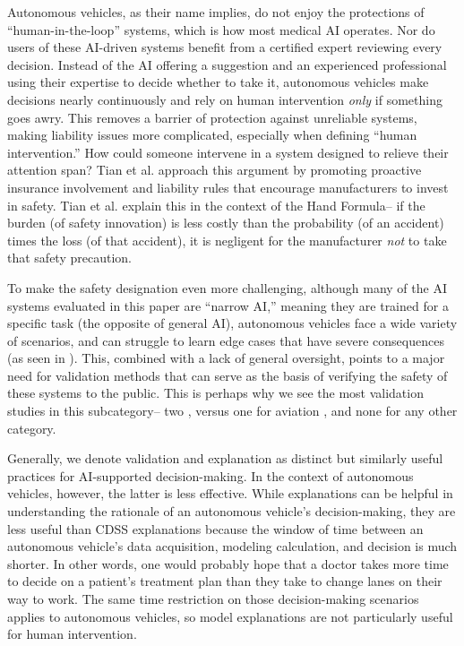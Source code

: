 \documentclass[authoryear,preprint,12pt]{elsarticle}
\begin{document}
Autonomous vehicles, as their name implies, do not enjoy the protections of
``human-in-the-loop'' systems, which is how most medical AI operates. Nor do
users of these AI-driven systems benefit from a certified expert reviewing every
decision. Instead of the AI offering a suggestion and an experienced
professional using their expertise to decide whether to take it, autonomous
vehicles make decisions nearly continuously and rely on human intervention
\textit{only} if something goes awry. This removes a barrier of protection
against unreliable systems, making liability issues more complicated, especially
when defining ``human intervention.'' How could someone intervene in a system
designed to relieve their attention span? Tian et al.
\cite{tianHowShouldAutonomous2025} approach this argument by promoting proactive
insurance involvement and liability rules that encourage manufacturers to invest
in safety. Tian et al. \cite{tianHowShouldAutonomous2025} explain this in the
context of the Hand Formula-- if the burden (of safety innovation) is less
costly than the probability (of an accident) times the loss (of that accident),
it is negligent for the manufacturer \textit{not} to take that safety
precaution.

To make the safety designation even more challenging, although many of the AI
systems evaluated in this paper are ``narrow AI,'' meaning they are trained for
a specific task (the opposite of general AI), autonomous vehicles face a wide
variety of scenarios, and can struggle to learn edge cases that have severe
consequences (as seen in \cite{yangPredictionFailureRiskaware2023}). This,
combined with a lack of general oversight, points to a major need for validation
methods that can serve as the basis of verifying the safety of these systems to
the public. This is perhaps why we see the most validation studies in this
subcategory-- two \cite{yangPredictionFailureRiskaware2023,jiAcceleratedTestingEvaluation2025}, versus one for aviation
\cite{mossBayesianSafetyValidation2024}, and none for any other category. 

Generally, we denote validation and explanation as distinct but similarly useful
practices for AI-supported decision-making. In the context of autonomous
vehicles, however, the latter is less effective. While explanations can be
helpful in understanding the rationale of an autonomous vehicle's
decision-making, they are less useful than CDSS explanations because the window
of time between an autonomous vehicle's data acquisition, modeling calculation,
and decision is much shorter. In other words, one would probably hope that a
doctor takes more time to decide on a patient's treatment plan than they take to
change lanes on their way to work. The same time restriction on those
decision-making scenarios applies to autonomous vehicles, so model explanations
are not particularly useful for human intervention. 
\end{document}
